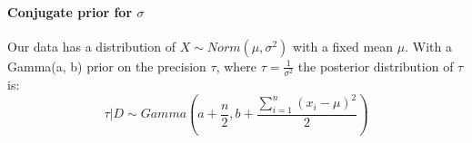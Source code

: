 \paragraph{Conjugate prior for $\sigma$}
Our data has a distribution of $X\sim Norm(\mu, \sigma^2)$ with a fixed mean $\mu$. With a Gamma(a, b) prior on the precision $\tau$, where $\tau = \frac{1}{\sigma^2}$ the posterior distribution of $\tau$ is:
\begin{equation*}
\tau|D\sim Gamma\left(a+\frac{n}{2}, b+\frac{\sum_{i=1}^{n}(x_i-\mu)^2}{2}\right)
\end{equation*}